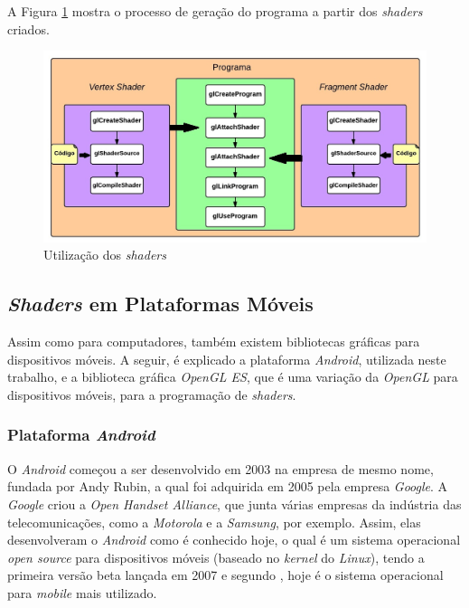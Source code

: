 	A Figura \ref{shader_use} mostra o processo de geração do programa a partir dos \textit{shaders} criados.

	\begin{figure}[ht]
	\centering
		\includegraphics[keepaspectratio=true,scale=0.4]{figuras/shader_use.jpg}
	\caption{Utilização dos \textit{shaders}}
	\label{shader_use}
	\end{figure}


\subsection{\textit{Shaders} em Plataformas Móveis}

	Assim como para computadores, também existem bibliotecas gráficas para dispositivos móveis. A seguir, é explicado a plataforma \textit{Android}, utilizada neste trabalho, e a biblioteca gráfica \textit{OpenGL ES}, que é uma variação da \textit{OpenGL} para dispositivos móveis, para a programação de \textit{shaders}.

	\subsubsection{Plataforma \textit{Android}}

	O \textit{Android} começou a ser desenvolvido em 2003 na empresa de mesmo nome, fundada por Andy Rubin, a qual foi adquirida em 2005 pela empresa \textit{Google}. A \textit{Google} criou a \textit{Open Handset Alliance}, que junta várias empresas da indústria das telecomunicações, como a \textit{Motorola} e a \textit{Samsung}, por exemplo. Assim, elas desenvolveram o \textit{Android} como é conhecido hoje, o qual é um sistema operacional  \textit{open source} para dispositivos móveis (baseado no \textit{kernel} do \textit{Linux}), tendo a primeira versão beta lançada em 2007 e segundo \cite{android2013}, hoje é o sistema operacional para \textit{mobile} mais utilizado.

